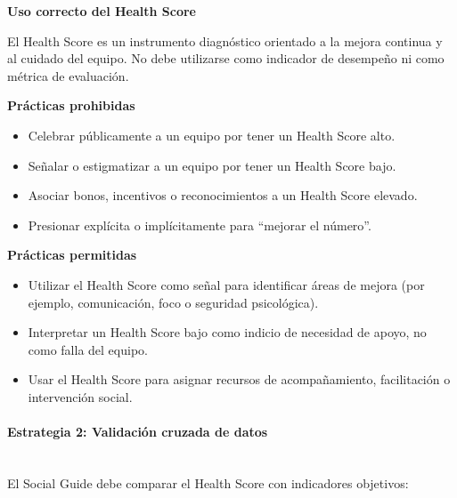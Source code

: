 \begin{protocolo}
    \textbf{Uso correcto del Health Score}

    El Health Score es un instrumento diagnóstico orientado a la mejora continua y al cuidado del equipo. No debe utilizarse como indicador de desempeño ni como métrica de evaluación.

    \textbf{Prácticas prohibidas}
    \begin{itemize}
        \item Celebrar públicamente a un equipo por tener un Health Score alto.
        \item Señalar o estigmatizar a un equipo por tener un Health Score bajo.
        \item Asociar bonos, incentivos o reconocimientos a un Health Score elevado.
        \item Presionar explícita o implícitamente para “mejorar el número”.
    \end{itemize}

    \textbf{Prácticas permitidas}
    \begin{itemize}
        \item Utilizar el Health Score como señal para identificar áreas de mejora (por ejemplo, comunicación, foco o seguridad psicológica).
        \item Interpretar un Health Score bajo como indicio de necesidad de apoyo, no como falla del equipo.
        \item Usar el Health Score para asignar recursos de acompañamiento, facilitación o intervención social.
    \end{itemize}
\end{protocolo}

\paragraph{Estrategia 2: Validación cruzada de datos}\mbox{}\\[-0.3\baselineskip]

El Social Guide debe comparar el Health Score con indicadores objetivos:

